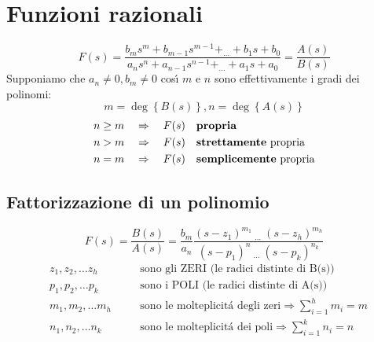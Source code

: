 \documentclass[../main.tex]{subfiles}
\begin{document}
	\section{Funzioni razionali}
	\[ F(s) = \frac{b_m s^m + b_{m-1} s^{m-1} + _{\dots} + b_1 s + b_0}{a_n s^n + a_{n-1} s^{n-1} + _{\dots} + a_1 s + a_0 } = \frac{A(s)}{B(s)} \]
	Supponiamo che $ a_n \neq 0, b_m \neq 0 $ cos\'{\i} $m$ e $n$ sono effettivamente i gradi dei polinomi: 
	$$ m = \deg\left\lbrace B(s) \right\rbrace, n=\deg \left\lbrace A(s) \right\rbrace $$
	\begin{align*}
		n \geq m \quad &\Rightarrow \quad F(s) \quad \text{\textbf{propria}}\\
		n > m \quad &\Rightarrow \quad F(s) \quad \text{\textbf{strettamente} propria}\\
		n = m \quad &\Rightarrow \quad F(s) \quad \text{\textbf{semplicemente} propria}
	\end{align*}
	\subsection{Fattorizzazione di un polinomio}
	\[ F(s) = \frac{B(s)}{A(s)} = \frac{b_m}{a_n} \frac{(s-z_1)^{m_1}\: _{\dots}\: (s-z_h)^{m_h}}{(s-p_1)^n\: _{\dots}\: (s-p_k)^{n_k}} \]
	\begin{align*}
		&z_1, z_2, \dots z_h \quad &&\text{sono gli ZERI (le radici distinte di B(s))}\\
		&p_1, p_2, \dots p_k \quad &&\text{sono i POLI (le radici distinte di A(s))}\\
		&m_1, m_2, \dots m_h \quad &&\text{sono le molteplicit\'{a} degli zeri} \Rightarrow \sum_{i=1}^{h}m_i = m\\
		&n_1, n_2, \dots n_k \quad &&\text{sono le molteplicit\'{a} dei poli} \Rightarrow \sum_{i=1}^{k}n_i = n
	\end{align*}
\end{document}
